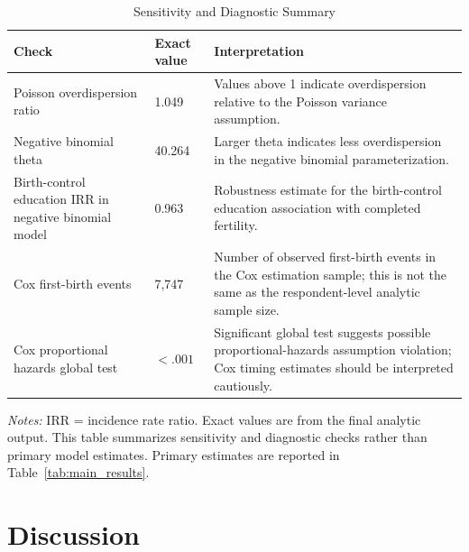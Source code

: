 \documentclass[12pt]{article}
\begin{document}
\begin{table}[!htbp]
\centering
\caption{Sensitivity and Diagnostic Summary}
\label{tab:robustness}
\small
\begin{adjustbox}{max width=\textwidth}
\begin{tabularx}{\textwidth}{Y p{0.18\textwidth} Y}
\toprule
\textbf{Check} & \textbf{Exact value} & \textbf{Interpretation} \\
\midrule
Poisson overdispersion ratio & 1.049 & Values above 1 indicate overdispersion relative to the Poisson variance assumption. \\
Negative binomial theta & 40.264 & Larger theta indicates less overdispersion in the negative binomial parameterization. \\
Birth-control education IRR in negative binomial model & 0.963 & Robustness estimate for the birth-control education association with completed fertility. \\
Cox first-birth events & 7,747 & Number of observed first-birth events in the Cox estimation sample; this is not the same as the respondent-level analytic sample size. \\
Cox proportional hazards global test & $< .001$ & Significant global test suggests possible proportional-hazards assumption violation; Cox timing estimates should be interpreted cautiously. \\
\bottomrule
\end{tabularx}
\end{adjustbox}
\begin{minipage}{0.95\textwidth}
\footnotesize
\textit{Notes:} IRR = incidence rate ratio. Exact values are from the final analytic output. This table summarizes sensitivity and diagnostic checks rather than primary model estimates. Primary estimates are reported in Table~\ref{tab:main_results}.
\end{minipage}
\end{table}


\section{Discussion}
\end{document}

